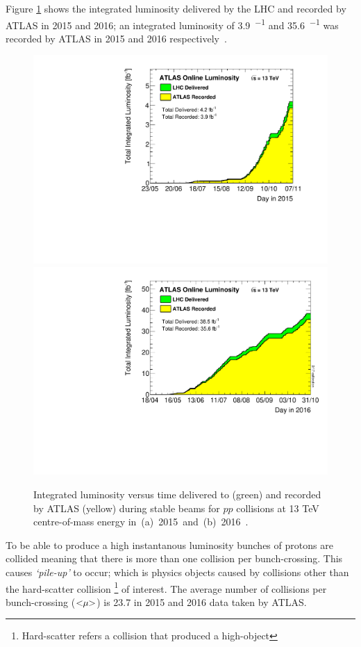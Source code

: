 Figure \ref{fig:det-lumi_2015_2016} shows the integrated luminosity delivered by the LHC and recorded by ATLAS in 2015 and 2016;
an integrated luminosity of \SI{3.9}{\fb^{-1}} and \SI{35.6}{\fb^{-1}} was recorded by ATLAS in 2015 and 2016 respectively~\cite{det-ATLAS_lumi_twiki}.
\begin{figure}[!ht]
  \begin{center}
    \includegraphics[width=0.45\linewidth, angle=0]{figs/Detector/lumi_2015.pdf}
    \includegraphics[width=0.45\linewidth, angle=0]{figs/Detector/lumi_2016.pdf}
  \end{center}
  \vspace{-1em}
  \caption[Integrated luminosity versus time delivered to and recorded by ATLAS during 2015 and 2016]
          {  \label{fig:det-lumi_2015_2016} Integrated luminosity versus time delivered to (green) and recorded by ATLAS (yellow) during stable beams for $pp$ collisions
            at 13 TeV centre-of-mass energy \mbox{in (a) 2015 and (b) 2016~\cite{det-ATLAS_lumi_twiki}}.}
\end{figure}

To be able to produce a high instantanous luminosity bunches of protons are collided meaning that there is more than one collision per bunch-crossing.
This causes \textit{`pile-up'} to occur;
which is physics objects caused by collisions other than the hard-scatter collision \footnote{Hard-scatter refers a collision that produced a high-\pT object} of interest.
The average number of collisions per bunch-crossing ($<\hspace{-3pt}\mu\hspace{-3pt}>$) is 23.7 in 2015 and 2016 data taken by ATLAS.

